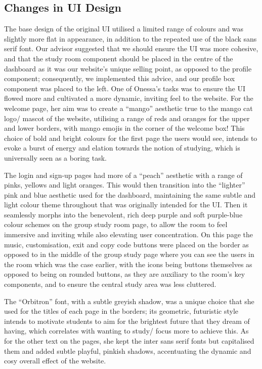 \subsection{Changes in UI Design}
The base design of the original UI utilised a limited range of colours and was slightly more flat in appearance, in addition to the repeated use of the black sans serif font. Our advisor suggested that we should ensure the UI was more cohesive, and that the study room component should be placed in the centre of the dashboard as it was our website’s unique selling point, as opposed to the profile component; consequently, we implemented this advice, and our profile box component was placed to the left. 
One of Onessa’s tasks was to ensure the UI flowed more and cultivated a more dynamic, inviting feel to the website. For the welcome page, her aim was to create a “mango” aesthetic true to the mango cat logo/ mascot of the website, utilising a range of reds and oranges for the upper and lower borders, with  mango emojis in the corner of the welcome box! This choice of bold and bright colours for the first page the users would see, intends to evoke a burst of energy and elation towards the notion of studying, which is universally seen as a boring task. 

The login and sign-up pages had more of a “peach” aesthetic with a range of pinks, yellows and light oranges. This would then transition into the “lighter” pink and blue aesthetic used for the dashboard, maintaining the same subtle and light colour theme throughout that was originally intended for the UI. Then it seamlessly morphs into the benevolent, rich deep purple and soft purple-blue colour schemes on the group study room page, to allow the room to feel immersive and inviting while also elevating user concentration. On this page the music, customisation, exit and copy code buttons were placed on the border as opposed to in the middle of the group study page where you can see the users in the room which was the case earlier, with the icons being buttons themselves as opposed to being on rounded buttons, as they are auxiliary to the room’s key components, and to ensure the central study area was less cluttered. 

The “Orbitron” font, with a subtle greyish shadow, was a unique choice that she used for the titles of each page in the borders; its geometric, futuristic style intends to motivate students to aim for the brightest future that they dream of having, which correlates with wanting to study/ focus more to achieve this. As for the other text on the pages, she kept the inter sans serif fonts but capitalised them and added subtle playful, pinkish shadows, accentuating the dynamic and cosy overall effect of the website. 

